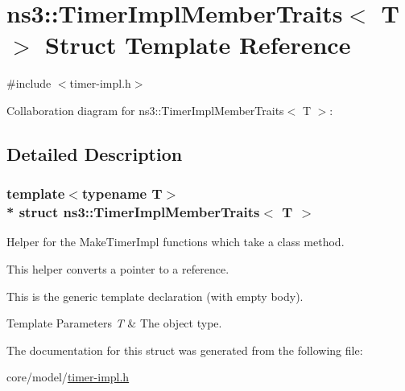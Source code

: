 \hypertarget{structns3_1_1TimerImplMemberTraits}{}\section{ns3\+:\+:Timer\+Impl\+Member\+Traits$<$ T $>$ Struct Template Reference}
\label{structns3_1_1TimerImplMemberTraits}


{\ttfamily \#include $<$timer-\/impl.\+h$>$}



Collaboration diagram for ns3\+:\+:Timer\+Impl\+Member\+Traits$<$ T $>$\+:


\subsection{Detailed Description}
\subsubsection*{template$<$typename T$>$\\*
struct ns3\+::\+Timer\+Impl\+Member\+Traits$<$ T $>$}

Helper for the Make\+Timer\+Impl functions which take a class method.

This helper converts a pointer to a reference.

This is the generic template declaration (with empty body).


\begin{DoxyTemplParams}{Template Parameters}
{\em T} & The object type. \\
\hline
\end{DoxyTemplParams}


The documentation for this struct was generated from the following file\+:\begin{DoxyCompactItemize}
\item 
core/model/\hyperlink{timer-impl_8h}{timer-\/impl.\+h}\end{DoxyCompactItemize}
